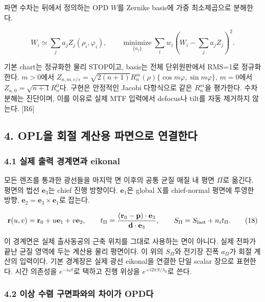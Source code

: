 \documentclass[
  a4paper,
]{article}
\begin{document}
파면 수차는 뒤에서 정의하는 OPD \(W\)를 Zernike basis에 가중
최소제곱으로 분해한다.

\[
W_i\simeq\sum_j a_jZ_j(\rho_i,\varphi_i),\qquad
\underset{\{a_j\}}{\operatorname{minimize}}
 \sum_iw_i\left(W_i-\sum_ja_jZ_j\right)^2.
\tag{17}
\]

기본 chart는 정규화한 물리 STOP이고, basis는 전체 단위원판에서 RMS=1로
정규화한다. \(m>0\)에서
\(Z_{n,m,c/s}=\sqrt{2(n+1)}R_n^m(\rho)\{\cos m\varphi,\sin m\varphi\}\),
\(m=0\)에서 \(Z_{n,0}=\sqrt{n+1}R_n^0\)다. 구현은 안정적인 Jacobi
다항식으로 같은 \(R_n^m\)을 평가한다. 수차 분해는 진단이며, 이를 이유로
실제 MTF 입력에서 defocus나 tilt를 자동 제거하지 않는다. {[}R6{]}

\hypertarget{opluxc744-uxd68cuxc808-uxacc4uxc0b0uxc6a9-uxd30cuxba74uxc73cuxb85c-uxc5f0uxacb0uxd55cuxb2e4}{%
\subsection{4. OPL을 회절 계산용 파면으로
연결한다}\label{opluxc744-uxd68cuxc808-uxacc4uxc0b0uxc6a9-uxd30cuxba74uxc73cuxb85c-uxc5f0uxacb0uxd55cuxb2e4}}

\hypertarget{uxc2e4uxc81c-uxcd9cuxb825-uxacbduxacc4uxba74uxacfc-eikonal}{%
\subsubsection{4.1 실제 출력 경계면과
eikonal}\label{uxc2e4uxc81c-uxcd9cuxb825-uxacbduxacc4uxba74uxacfc-eikonal}}

모든 렌즈를 통과한 광선들을 마지막 면 이후의 공통 균질 매질 내 평면
\(\Pi\)로 옮긴다. 평면의 법선 \(\mathbf e_3\)는 chief 진행 방향이다.
\(\mathbf e_1\)은 global X를 chief-normal 평면에 투영한 방향,
\(\mathbf e_2=\mathbf e_3\times\mathbf e_1\)로 잡는다.

\[
\mathbf r(u,v)=\mathbf r_0+u\mathbf e_1+v\mathbf e_2,\qquad
t_\Pi=\frac{(\mathbf r_0-\mathbf p)\cdot\mathbf e_3}
 {\mathbf d\cdot\mathbf e_3},\qquad
S_\Pi=S_{\rm last}+n_it_\Pi.
\tag{18}
\]

이 경계면은 실제 출사동공의 근축 위치를 그대로 사용하는 면이 아니다.
실제 전파가 끝난 균질 영역에 두는 계산용 물리 평면이다. 이 위의
\(S_\Pi\)와 전기장 진폭 \(a_\Pi\)가 회절 계산의 입력이다. 기본 경계장은
실제 광선 eikonal을 연결한 단일 scalar 장으로 표현한다. 시간 의존성을
\(e^{-i\omega t}\)로 택하고 진행 위상을 \(e^{+i2\pi S/\lambda_0}\)로
쓴다.

\hypertarget{uxc774uxc0c1-uxc218uxb834-uxad6cuxba74uxd30cuxc640uxc758-uxcc28uxc774uxac00-opduxb2e4}{%
\subsubsection{4.2 이상 수렴 구면파와의 차이가
OPD다}\label{uxc774uxc0c1-uxc218uxb834-uxad6cuxba74uxd30cuxc640uxc758-uxcc28uxc774uxac00-opduxb2e4}}
\end{document}
